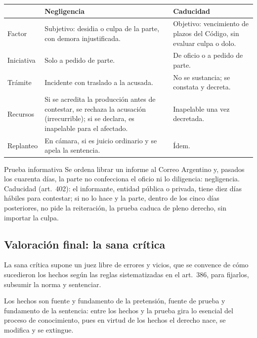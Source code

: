 \documentclass[12pt,oneside]{book}
\renewcommand{\arraystretch}{1.15}
\begin{document}
\begin{table}[H]
\centering
\renewcommand{\arraystretch}{1.25}
\begin{tabularx}{\textwidth}{>{\RaggedRight\arraybackslash}p{}>{\RaggedRight\arraybackslash}X>{\RaggedRight\arraybackslash}X}
\toprule
 & \textbf{Negligencia} & \textbf{Caducidad} \\
\midrule
Factor & Subjetivo: desidia o culpa de la parte, con demora injustificada. & Objetivo: vencimiento de plazos del Código, sin evaluar culpa o dolo. \\
Iniciativa & Solo a pedido de parte. & De oficio o a pedido de parte. \\
Trámite & Incidente con traslado a la acusada. & No se sustancia; se constata y decreta. \\
Recursos & Si se acredita la producción antes de contestar, se rechaza la acusación (irrecurrible); si se declara, es inapelable para el afectado. & Inapelable una vez decretada. \\
Replanteo & En cámara, si es juicio ordinario y se apela la sentencia. & Ídem. \\
\bottomrule
\end{tabularx}
\end{table}

\begin{ejemplo}{Prueba informativa}
Se ordena librar un informe al Correo Argentino y, pasados los cuarenta días, la parte no confecciona el oficio ni lo diligencia: negligencia. Caducidad (art.~402): el informante, entidad pública o privada, tiene diez días hábiles para contestar; si no lo hace y la parte, dentro de los cinco días posteriores, no pide la reiteración, la prueba caduca de pleno derecho, sin importar la culpa.
\end{ejemplo}

\subsection{Valoración final: la sana crítica}

La sana crítica supone un juez libre de errores y vicios, que se convence de cómo sucedieron los hechos según las reglas sistematizadas en el art.~386, para fijarlos, subsumir la norma y sentenciar. %

\begin{importante}
Los hechos son fuente y fundamento de la pretensión, fuente de prueba y fundamento de la sentencia: entre los hechos y la prueba gira lo esencial del proceso de conocimiento, pues en virtud de los hechos el derecho nace, se modifica y se extingue.
\end{importante}
\end{document}
